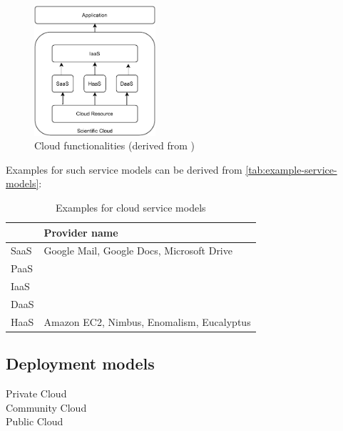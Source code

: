 \begin{figure}[h]
    \centering
    \includegraphics[width=0.4\textwidth]{figures/cloud-functionalities.pdf}
    \caption{Cloud functionalities (derived from \cite{Wang2010})}
    \label{fig:cloud-functionalities}
\end{figure}


Examples for such service models can be derived from \autoref{tab:example-service-models}:

\begin{table}[]
    \label{tab:example-service-models}
    \centering
    \caption{Examples for cloud service models}
    \begin{tabular}{|l|l|}
        \hline
             & Provider name                                \\ \hline
        SaaS & Google Mail, Google Docs, Microsoft Drive                                          \\ \hline
        PaaS &                                           \\ \hline
        IaaS &                                           \\ \hline
        DaaS &                                           \\ \hline
        HaaS & Amazon EC2, Nimbus, Enomalism, Eucalyptus \\ \hline
    \end{tabular}
\end{table}

\subsection{Deployment models}
\label{subsec:cloud-deployment}

Private Cloud\\

Community Cloud\\

Public Cloud\\

